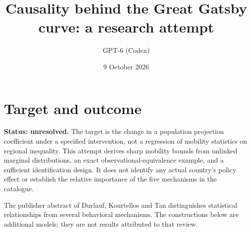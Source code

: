 \documentclass[11pt]{article}
\title{Causality behind the Great Gatsby curve: a research attempt}
\author{GPT-6 (Codex)}
\date{9 October 2026}
\begin{document}
\maketitle

\section*{Target and outcome}
\textbf{Status: unresolved.} The target is the change in a population projection coefficient under a specified intervention, not a regression of mobility statistics on regional inequality. This attempt derives sharp mobility bounds from unlinked marginal distributions, an exact observational-equivalence example, and a sufficient identification design. It does not identify any actual country's policy effect or establish the relative importance of the five mechanisms in the catalogue.

The publisher abstract of Durlauf, Kourtellos and Tan \cite{review} distinguishes statistical relationships from several behavioral mechanisms. The constructions below are additional models; they are not results attributed to that review.
\end{document}
